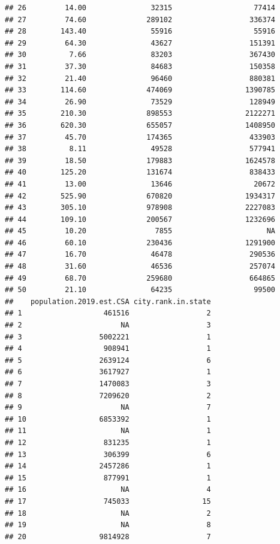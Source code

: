 \documentclass[
]{article}
\begin{document}
\begin{verbatim}
## 26         14.00               32315                   77414
## 27         74.60              289102                  336374
## 28        143.40               55916                   55916
## 29         64.30               43627                  151391
## 30          7.66               83203                  367430
## 31         37.30               84683                  150358
## 32         21.40               96460                  880381
## 33        114.60              474069                 1390785
## 34         26.90               73529                  128949
## 35        210.30              898553                 2122271
## 36        620.30              655057                 1408950
## 37         45.70              174365                  433903
## 38          8.11               49528                  577941
## 39         18.50              179883                 1624578
## 40        125.20              131674                  838433
## 41         13.00               13646                   20672
## 42        525.90              670820                 1934317
## 43        305.10              978908                 2227083
## 44        109.10              200567                 1232696
## 45         10.20                7855                      NA
## 46         60.10              230436                 1291900
## 47         16.70               46478                  290536
## 48         31.60               46536                  257074
## 49         68.70              259680                  664865
## 50         21.10               64235                   99500
##    population.2019.est.CSA city.rank.in.state
## 1                   461516                  2
## 2                       NA                  3
## 3                  5002221                  1
## 4                   908941                  1
## 5                  2639124                  6
## 6                  3617927                  1
## 7                  1470083                  3
## 8                  7209620                  2
## 9                       NA                  7
## 10                 6853392                  1
## 11                      NA                  1
## 12                  831235                  1
## 13                  306399                  6
## 14                 2457286                  1
## 15                  877991                  1
## 16                      NA                  4
## 17                  745033                 15
## 18                      NA                  2
## 19                      NA                  8
## 20                 9814928                  7

\end{verbatim}
\end{document}
